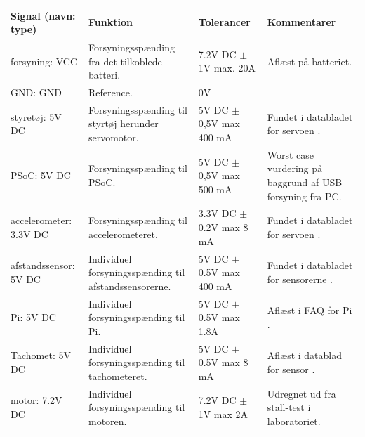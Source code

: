 \begin{table}[h]
	\centering
	\begin{tabularx}{\textwidth}{|l|Z|Z|Z|} \hline
	\textbf{Signal (navn: type)} & \textbf{Funktion} & \textbf{Tolerancer} & \textbf{Kommentarer} \\ \hline
forsyning: VCC
	& Forsyningsspænding fra det tilkoblede batteri. 
	& 7.2V DC $\pm$ 1V max. 20A
 	& Aflæst på batteriet.
	\\ \hline
	
GND: GND
	& Reference. 
	& 0V
 	& ~
	\\ \hline
	
styretøj: 5V DC
	& Forsyningsspænding til styrtøj herunder servomotor. 
	& 5V DC $\pm$ 0,5V max 400 mA
 	& Fundet i databladet for servoen \cite{lib:servo}.
	\\ \hline
	
PSoC: 5V DC
	& Forsyningsspænding til PSoC. 
	& 5V DC $\pm$ 0,5V max 500 mA
 	& Worst case vurdering på baggrund af USB forsyning fra PC.
	\\ \hline
	
	
accelerometer: 3.3V DC
	& Forsyningsspænding til accelerometeret.
	& 3.3V DC $\pm$ 0.2V max 8 mA
 	& Fundet i databladet for servoen \cite{lib:accel}.
	\\ \hline
	
afstandssensor: 5V DC
	& Individuel forsyningsspænding til afstandssensorerne.
	& 5V DC $\pm$ 0.5V max 400 mA
 	& Fundet i databladet for sensorerne \cite{lib:maxsonar}.
	\\ \hline
	
Pi: 5V DC
	& Individuel forsyningsspænding til Pi.
	& 5V DC $\pm$ 0.5V max 1.8A
 	& Aflæst i FAQ for Pi \cite{lib:PI2PSU}.
	\\ \hline
	
Tachomet: 5V DC
	& Individuel forsyningsspænding til tachometeret.
	& 5V DC $\pm$ 0.5V max 8 mA
 	& Aflæst i datablad for sensor \cite{lib:tacho}.
	\\ \hline
	
motor: 7.2V DC
	& Individuel forsyningsspænding til motoren.
	& 7.2V DC $\pm$ 1V max 2A

 	& Udregnet ud fra stall-test i laboratoriet.
	\\ \hline
	\end{tabularx}
	\label{tbl:bil_forsyninger}
\end{table}
\clearpage

\clearpage

\clearpage

\clearpage

\clearpage


